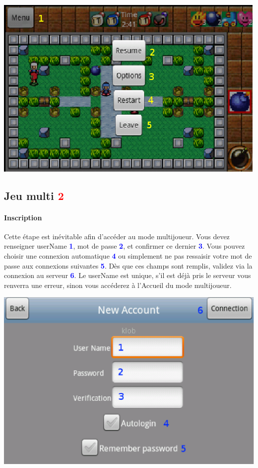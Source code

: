 	\begin{center}
		\includegraphics[scale=0.8]{Manuel/Img/20.eps}
	\end{center}


\subsection{Jeu multi \textcolor{red}{2}}

	\paragraph{Inscription}
	Cette étape est inévitable afin d'accéder au mode multijoueur. Vous devez
	renseigner userName \textcolor{blue}{\textbf{1}}, mot de passe
	\textcolor{blue}{\textbf{2}}, et confirmer ce dernier
	\textcolor{blue}{\textbf{3}}. Vous pouvez choisir une connexion automatique
	\textcolor{blue}{\textbf{4}} ou simplement ne pas ressaisir votre mot de passe
	aux connexions suivantes \textcolor{blue}{\textbf{5}}. Dès que ces champs sont
	remplis, validez via la connexion au serveur \textcolor{blue}{\textbf{6}}. Le
	userName est unique, s'il est déjà pris le serveur vous renverra une erreur,
	sinon vous accéderez à l'Accueil du mode multijoueur.
	
	
	\begin{center}
		\includegraphics[scale=0.7]{Manuel/Img/18.eps}
	\end{center}
	
